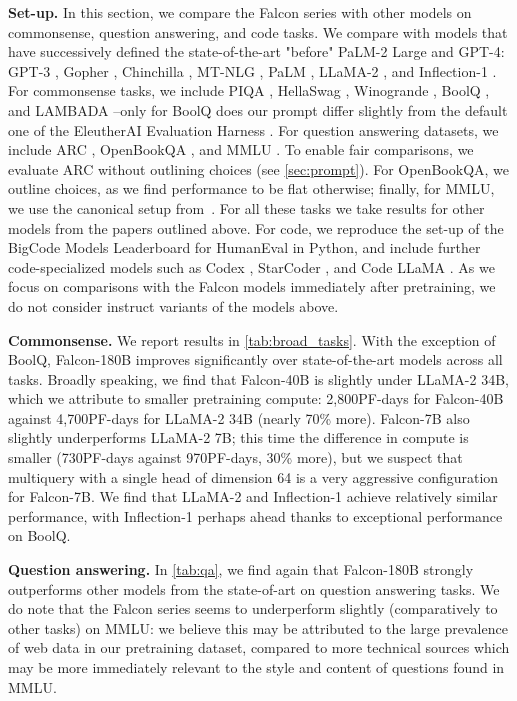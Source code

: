 \documentclass{article}
\begin{document}
\textbf{Set-up.} In this section, we compare the Falcon series with other models on commonsense, question answering, and code tasks. We compare with models that have successively defined the state-of-the-art "before" PaLM-2 Large and GPT-4: GPT-3 \citep{brown2020gpt3}, Gopher \citep{gopher}, Chinchilla \citep{hoffmann2022training}, MT-NLG \citep{smith2022using}, PaLM \citep{palm}, LLaMA-2 \citep{llama2}, and Inflection-1 \citep{inflection-1}. For commonsense tasks, we include PIQA \citep{bisk2020piqa}, HellaSwag \citep{zellers2019hellaswag}, Winogrande \citep{sakaguchi2019winogrande}, BoolQ \citep{clark2019boolq}, and LAMBADA \citep{paperno2016lambada}--only for BoolQ does our prompt differ slightly from the default one of the EleutherAI Evaluation Harness \citep{eval-harness}. For question answering datasets, we include ARC \citep{clark2018arc}, OpenBookQA \citep{mihaylov2press2021train018openbookqa}, and MMLU \citep{hendrycks2020measuring}. To enable fair comparisons, we evaluate ARC without outlining choices (see \cref{sec:prompt}). For OpenBookQA, we outline choices, as we find performance to be flat otherwise; finally, for MMLU, we use the canonical setup from~\citet{hendrycks2020measuring}. For all these tasks we take results for other models from the papers outlined above. For code, we reproduce the set-up of the BigCode Models Leaderboard for HumanEval in Python, and include further code-specialized models such as Codex \citep{chen2021evaluating}, StarCoder \citep{li2023starcoder}, and Code LLaMA \citep{roziere2023code}. As we focus on comparisons with the Falcon models immediately after pretraining, we do not consider instruct variants of the models above.

\textbf{Commonsense.} We report results in \cref{tab:broad_tasks}. With the exception of BoolQ, Falcon-180B improves significantly over state-of-the-art models across all tasks. Broadly speaking, we find that Falcon-40B is slightly under LLaMA-2 34B, which we attribute to smaller pretraining compute: 2,800PF-days for Falcon-40B against 4,700PF-days for LLaMA-2 34B (nearly 70\% more). Falcon-7B also slightly underperforms LLaMA-2 7B; this time the difference in compute is smaller (730PF-days against 970PF-days, 30\% more), but we suspect that multiquery with a single head of dimension 64 is a very aggressive configuration for Falcon-7B. We find that LLaMA-2 and Inflection-1 achieve relatively similar performance, with Inflection-1 perhaps ahead thanks to exceptional performance on BoolQ.

\textbf{Question answering.} In \cref{tab:qa}, we find again that Falcon-180B strongly outperforms other models from the state-of-art on question answering tasks. We do note that the Falcon series seems to underperform slightly (comparatively to other tasks) on MMLU: we believe this may be attributed to the large prevalence of web data in our pretraining dataset, compared to more technical sources which may be more immediately relevant to the style and content of questions found in MMLU. 
\end{document}
